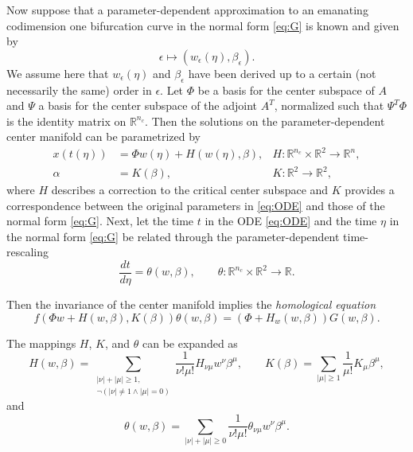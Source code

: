 Now suppose that a parameter-dependent approximation to an emanating
codimension one bifurcation curve in the normal form \cref{eq:G} is known and given by
\begin{equation}
    \label{eq:general_approximation} 
    \epsilon \mapsto (w_\epsilon(\eta), \beta_\epsilon).
\end{equation}
We assume here that $w_\epsilon(\eta)$ and $\beta_\epsilon$ have been derived
up to a certain (not necessarily the same) order in $\epsilon$. Let $\Phi$
be a basis for the center subspace of $A$ and $\Psi$ a basis for the center
subspace of the adjoint $A^T$, normalized such that $\Psi^T \Phi$ is the
identity matrix on $\mathbb R^{n_c}$. Then 
the solutions on the parameter-dependent center manifold can be
parametrized by 
\begin{align}
    \label{eq:H}
    x(t(\eta)) &= \Phi w(\eta) + H(w(\eta), \beta), 
               & H\colon\mathbb R^{n_c} \times \mathbb R^2 \to \mathbb R^n, \\
               \label{eq:K}
    \alpha &= K(\beta), 
           & K\colon\mathbb R^2 \to \mathbb R^2,
\end{align}
where $H$ describes a correction to the critical center subspace and $K$ provides a correspondence between the original parameters in \cref{eq:ODE} and those of the normal form \cref{eq:G}.
Next, let the time $t$ in the ODE \cref{eq:ODE} and the time $\eta$ in the normal form
\cref{eq:G} be related through the parameter-dependent time-rescaling
\begin{equation}
				\label{eq:theta}
				\frac{dt}{d\eta} = \theta(w, \beta), \qquad 
								\theta\colon \mathbb R^{n_c} \times \mathbb R^2 \to \mathbb R.
\end{equation}

Then the invariance of the center manifold implies the \emph{homological
equation}
\begin{equation}
    \label{eq:homological_equation}
    \tag{HOM}
    f(\Phi w + H(w,\beta), K(\beta)) \theta(w, \beta) = (\Phi + H_w(w, \beta)) G(w,\beta).
\end{equation}

The mappings $H$, $K$, and $\theta$ can be expanded as
\begin{equation}
    \label{eq:HK_expansion}
    H(w, \beta) = \sum_{\substack{|\nu|+|\mu| \geq 1, \\ \neg(|\nu|\neq 1 \wedge |\mu|=0)}} \frac{1}{\nu!\mu!} H_{\nu\mu} w^\nu \beta^\mu,
    \qquad
    K(\beta) = \sum_{|\mu|\geq 1} \frac1{\mu!} K_\mu \beta^\mu,
\end{equation}
and
\begin{equation}
    \label{eq:theta_expansion}
    \theta(w, \beta) = \sum_{|\nu|+|\mu| \geq 0} \frac1{\nu!\mu!} \theta_{\nu\mu} w^\nu \beta^\mu.
\end{equation}

